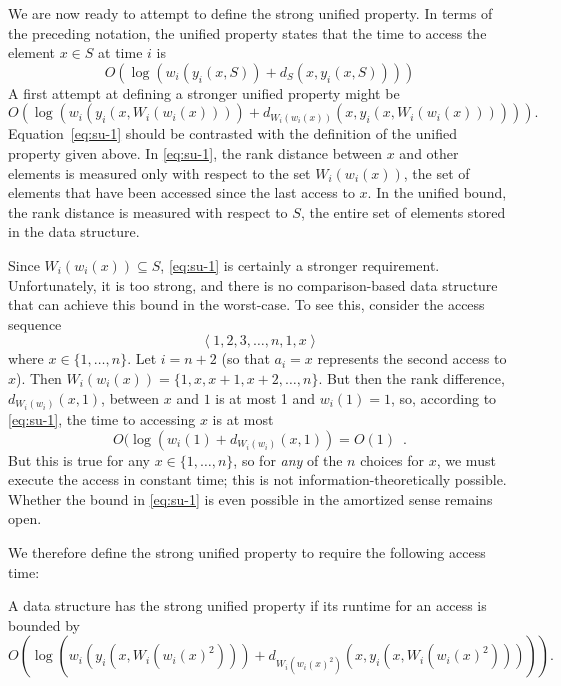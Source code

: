 \documentclass{llncs}
\newcommand{\BigOh}[1]{O\!\left(#1\right)}
\begin{document}
We are now ready to attempt to define the strong unified property. In terms of the preceding notation, the unified property states that the time to access the element $x \in S$ at time $i$ is 
\begin{displaymath}
	\BigOh{\log (w_i(y_i(x,S)) + d_S(x,y_i(x,S)))}
\end{displaymath}
%
A first attempt at defining a stronger unified property might be 
\begin{equation}
	\BigOh{\log (w_i(y_i(x,W_i(w_i(x)))) + d_{W_i(w_i(x))}(x,y_i(x,W_i(w_i(x)))))}. \label{eq:su-1}
\end{equation}
Equation~\ref{eq:su-1} should be contrasted with the definition of the unified property given above.  In \ref{eq:su-1}, the rank distance between $x$ and other elements is measured only with respect to the set $W_i(w_i(x))$, the set of elements that have been accessed since the last access to $x$.  In the unified bound, the rank distance is measured with respect to $S$, the entire set of elements stored in the data structure.

Since $W_i(w_i(x))\subseteq S$, \ref{eq:su-1} is certainly a stronger requirement.  Unfortunately, it is too strong, and there is no comparison-based data structure that can achieve this bound in the worst-case. To see this, consider the access sequence
\begin{displaymath}
	\left\langle 1,2,3,\ldots,n,1,x \right\rangle
\end{displaymath}
where $x \in \{1,\ldots,n\}$.  Let $i={n+2}$ (so that $a_i =x$ represents the second access to $x$).  Then $W_i(w_i(x)) = \{1,x,x+1,x+2,\ldots,n\}$.  But then the rank difference, $d_{W_i(w_i)}(x,1)$, between $x$ and $1$ is at most 1 and $w_i(1)=1$, so, according to \eqref{eq:su-1}, the time to accessing $x$ is at most\[
   O(\log(w_i(1)+d_{W_i(w_i)}(x,1)) = O(1) \enspace .
\]
But this is true for any $x\in\{1,\ldots,n\}$, so for \emph{any} of the $n$ choices for $x$, we must execute the access in constant time; this is not information-theoretically possible.
Whether the bound in \eqref{eq:su-1} is even possible in the amortized
sense remains open.

We therefore define the strong unified property to require the following access time:

\begin{definition} A data structure has the strong unified property if its runtime for an access is bounded by
\begin{displaymath}
	\BigOh{\log (w_i(y_i(x,W_i(w_i(x)^2))) + d_{W_i(w_i(x)^2)}(x,y_i(x,W_i(w_i(x)^2))))}.
\end{displaymath}
\end{definition}
\end{document}
